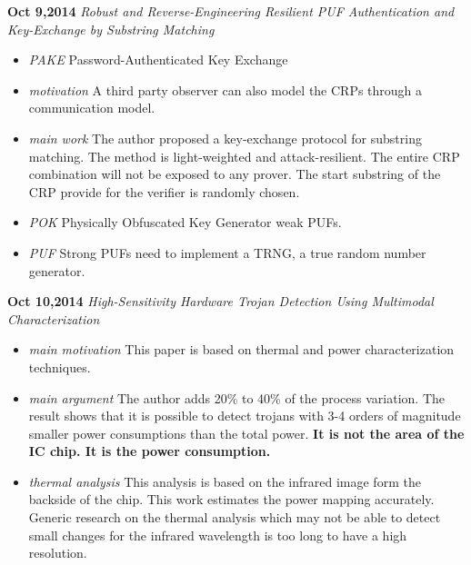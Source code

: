 \documentclass[]{article}
\begin{document}
\noindent \textbf{Oct 9,2014}
\textit{Robust and Reverse-Engineering Resilient PUF Authentication and Key-Exchange by Substring Matching}
\indent		\begin{itemize}

                \item \textit{PAKE} Password-Authenticated Key Exchange

                \item \textit{motivation} A third party observer can also model the CRPs through a 
                communication model.

                \item \textit{main work} The author proposed a key-exchange protocol for substring matching. 
                The method is light-weighted and attack-resilient. The entire CRP combination will not be
                exposed to any prover. The start substring of the CRP provide for the verifier is randomly 
                chosen.

                \item \textit{POK} Physically Obfuscated Key Generator weak PUFs.

                \item \textit{PUF}  Strong PUFs need to implement a TRNG, a true random number generator.

            \end{itemize}

\noindent \textbf{Oct 10,2014}
\textit{High-Sensitivity Hardware Trojan Detection Using Multimodal Characterization}
\indent		\begin{itemize}

                \item \textit{main motivation} This paper is based on thermal and power characterization 
                techniques. 

                \item \textit{main argument} The author adds 20\% to 40\% of the process variation. The result
                shows that it is possible to detect trojans with 3-4 orders of magnitude smaller power consumptions 
                than the total power. \textbf{It is not the area of the IC chip. It is the power consumption.}
                
                \item \textit{thermal analysis} This analysis is based on the infrared image form the backside of 
                the chip. This work estimates the power mapping accurately. Generic research on the thermal analysis
                which may not be able to detect small changes for the infrared wavelength is too long to have a 
                high resolution.
       		\end{itemize}
\end{document}
